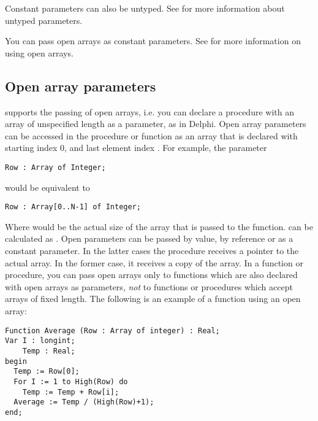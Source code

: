 \documentclass{report}
\begin{document}
Constant parameters can also be untyped. See  for more
information about untyped parameters.

You can pass open arrays as constant parameters. See  for
more information on using open arrays.
\subsection{Open array parameters}
\label{se:openarray}
\fpc supports the passing of open arrays, i.e. you can declare a procedure
with an array of unspecified length as a parameter, as in Delphi.
Open array parameters can be accessed in the procedure or function as an
array that is declared with starting index 0, and last element
index .
For example, the parameter
\begin{verbatim}
Row : Array of Integer;
\end{verbatim}
would be equivalent to
\begin{verbatim}
Row : Array[0..N-1] of Integer;
\end{verbatim}
Where   would be the actual size of the array that is passed to the
function.  can be calculated as .
Open parameters can be passed by value, by reference or as a constant
parameter. In the latter cases the procedure receives a pointer to the
actual array. In the former case, it receives a copy of the array.
In a function or procedure, you can pass open arrays only to functions which
are also declared with open arrays as parameters, {\em not} to functions or
procedures which accept arrays of fixed length.
The following is an example of a function using an open array:
\begin{verbatim}
Function Average (Row : Array of integer) : Real;
Var I : longint;
    Temp : Real;
begin
  Temp := Row[0];
  For I := 1 to High(Row) do
    Temp := Temp + Row[i];
  Average := Temp / (High(Row)+1);
end;
\end{verbatim}

\end{document}
